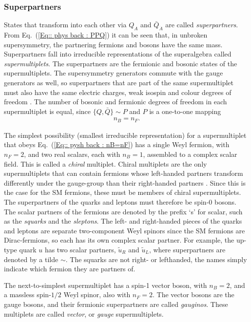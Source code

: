 \documentclass[twoside,english]{uiofysmaster}
\begin{document}
\subsubsection{Superpartners}\label{Sec:: phys back : Superpartners}

States that transform into each other via $Q_A$ and $\bar{Q}_{\dot{A}}$ are called \textit{superpartners}. From Eq.~(\ref{Eq:: phys back : PPQ}) it can be seen that, in unbroken supersymmetry, the partnering fermions and bosons have the same mass. Superpartners fall into irreducible representations of the superalgebra called \textit{supermultiplets}. The superpartners are the fermionic and bosonic states of the supermultiplets. The supersymmetry generators commute with the gauge generators as well, so superpartners that are part of the same supermultiplet must also have the same electric charges, weak isospin and colour degrees of freedom \cite{martin2010supersymmetry}. The number of bosonic and fermionic degrees of freedom in each supermultiplet is equal, since $\{Q, \bar{Q}\} \sim P$ and $P$ is a one-to-one mapping 
\begin{align}\label{Eq:: pysh back : nB=nF}
n_B = n_F.
\end{align}

The simplest possibility (smallest irreducible representation) for a supermultiplet that obeys Eq.~(\ref{Eq:: pysh back : nB=nF}) has a single Weyl fermion, with $n_F =2$, and two real scalars, each with $n_B=1$, assembled to a complex scalar field. This is called a \textit{chiral} multiplet. Chiral multiplets are the only supermultiplets that can contain fermions whose left-handed partners transform differently under the gauge-group than their right-handed partners \cite{martin2010supersymmetry}. Since this is the case for the SM fermions, these must be members of chiral supermultiplets. The superpartners of the quarks and leptons must therefore be spin-0 bosons. The scalar partners of the fermions are denoted by the prefix `s' for scalar, such as the \textit{squarks} and the \textit{sleptons}. The left- and right-handed pieces of the quarks and leptons are separate two-component Weyl spinors since the SM fermions are Dirac-fermions, so each has its own complex scalar partner. For example, the up-type quark $u$ has two scalar partners, $\widetilde{u}_R$ and $\widetilde{u}_L$, where superpartners are denoted by a tilde $\sim$. The squarks are not right- or lefthanded, the names simply indicate which fermion they are partners of.

The next-to-simplest supermultiplet has a spin-1 vector boson, with $n_B=2$, and a massless spin-$1/2$ Weyl spinor, also with $n_F=2$. The vector bosons are the gauge bosons, and their fermionic superpartners are called \textit{gauginos}. These multiplets are called \textit{vector}, or \textit{gauge} supermultiplets. 
\end{document}
